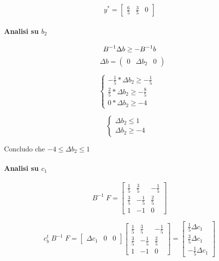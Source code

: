 \[
    y^{*} = 
    \begin{bmatrix}
        \frac 6 5 & \frac 3 5 & 0
    \end{bmatrix}
\]

\paragraph{Analisi su $b_2$}

\[
    B^{-1} \Delta b \geq -B^{-1}b \\
\]
\[
    \;\;\; \Delta b = 
    \begin{pmatrix}
        0 & \Delta b_2 & 0
    \end{pmatrix}
\]

\[
    \begin{cases}
       - \frac 1 5 * \Delta b_2 \geq - \frac 1 5 & \\
       \frac 2 5 * \Delta b_2 \geq - \frac 8 5 & \\
       0 * \Delta b_2 \geq -4 & 
    \end{cases}
\]

\[
    \begin{cases}
       \Delta b_2 \leq 1 & \\
       \Delta b_2 \geq - 4 &
    \end{cases}
\]

Concludo che $-4 \leq \Delta b_2 \leq 1$

\paragraph{Analisi su $c_1$}

\[
    B^{-1} \; F = 
    \begin{bmatrix}
        \frac 1 5 & \frac 3 5 & - \frac 1 5 \\
        \frac 3 5 & - \frac 1 5 & \frac 2 5 \\
        1 & -1 & 0
    \end{bmatrix}
\]

\[
    c^t_b \; B^{-1} \; F =
    \begin{bmatrix}
        \Delta c_1 & 0 & 0
    \end{bmatrix}
    \begin{bmatrix}
        \frac 1 5 & \frac 3 5 & - \frac 1 5 \\
        \frac 3 5 & - \frac 1 5 & \frac 2 5 \\
        1 & -1 & 0
    \end{bmatrix} = 
    \begin{bmatrix}
        \frac 1 5 \Delta c_1 \\
        \frac 3 5 \Delta c_1 \\
        - \frac 1 5 \Delta c_1
    \end{bmatrix}
\]

